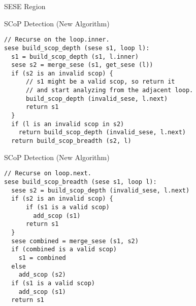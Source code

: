 \documentclass{beamer}
\begin{document}
\begin{frame}[fragile]{SESE Region}
\end{frame}




\begin{frame}[fragile]{SCoP Detection (New Algorithm)}
\begin{verbatim}
// Recurse on the loop.inner.
sese build_scop_depth (sese s1, loop l):
  s1 = build_scop_depth (s1, l.inner)
  sese s2 = merge_sese (s1, get_sese (l))
  if (s2 is an invalid scop) {
      // s1 might be a valid scop, so return it
      // and start analyzing from the adjacent loop.
      build_scop_depth (invalid_sese, l.next)
      return s1
  }
  if (l is an invalid scop in s2)
    return build_scop_depth (invalid_sese, l.next)
  return build_scop_breadth (s2, l)
\end{verbatim}
\end{frame}

\begin{frame}[fragile]{SCoP Detection (New Algorithm)}
\begin{verbatim}
// Recurse on loop.next.
sese build_scop_breadth (sese s1, loop l):
  sese s2 = build_scop_depth (invalid_sese, l.next)
  if (s2 is an invalid scop) {
      if (s1 is a valid scop)
        add_scop (s1)
      return s1
  }
  sese combined = merge_sese (s1, s2)
  if (combined is a valid scop)
    s1 = combined
  else
    add_scop (s2)
  if (s1 is a valid scop)
    add_scop (s1)
  return s1
\end{verbatim}
\end{frame}
\end{document}
